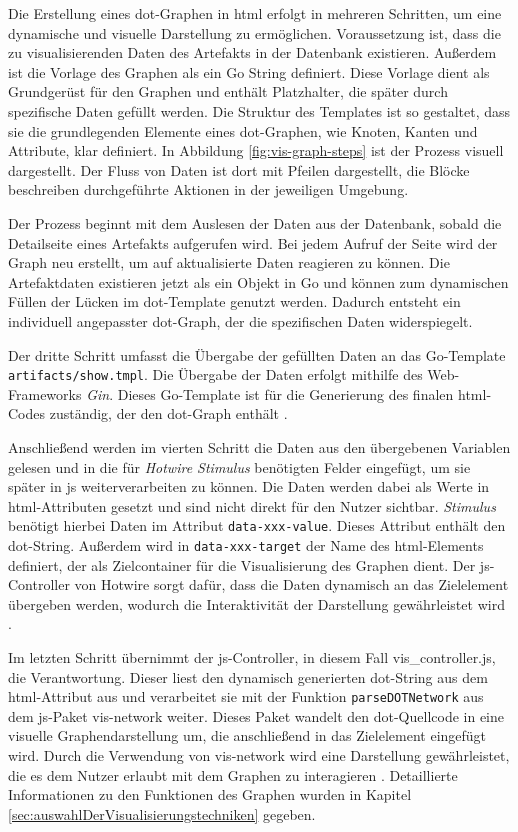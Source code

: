 \par Die Erstellung eines \gls{dot}-Graphen in \gls{html} erfolgt in mehreren Schritten, um eine dynamische und visuelle Darstellung zu ermöglichen. Voraussetzung ist, dass die zu visualisierenden Daten des Artefakts in der Datenbank existieren. Außerdem ist die Vorlage des Graphen als ein Go String definiert. Diese Vorlage dient als Grundgerüst für den Graphen und enthält Platzhalter, die später durch spezifische Daten gefüllt werden. Die Struktur des Templates ist so gestaltet, dass sie die grundlegenden Elemente eines \gls{dot}-Graphen, wie Knoten, Kanten und Attribute, klar definiert. In Abbildung \ref{fig:vis-graph-steps} ist der Prozess visuell dargestellt. Der Fluss von Daten ist dort mit Pfeilen dargestellt, die Blöcke beschreiben durchgeführte Aktionen in der jeweiligen Umgebung.
\par Der Prozess beginnt mit dem Auslesen der Daten aus der Datenbank, sobald die Detailseite eines Artefakts aufgerufen wird. Bei jedem Aufruf der Seite wird der Graph neu erstellt, um auf aktualisierte Daten reagieren zu können. Die Artefaktdaten existieren jetzt als ein Objekt in Go und können zum dynamischen Füllen der Lücken im \gls{dot}-Template genutzt werden. Dadurch entsteht ein individuell angepasster \gls{dot}-Graph, der die spezifischen Daten widerspiegelt.
\par Der dritte Schritt umfasst die Übergabe der gefüllten Daten an das Go-Template \verb|artifacts/show.tmpl|. Die Übergabe der Daten erfolgt mithilfe des Web-Frameworks \textit{Gin}. Dieses Go-Template ist für die Generierung des finalen \gls{html}-Codes zuständig, der den \gls{dot}-Graph enthält \autocite{GingonicGinGin}.
\par Anschließend werden im vierten Schritt die Daten aus den übergebenen Variablen gelesen und in die für \textit{Hotwire Stimulus} benötigten Felder eingefügt, um sie später in \gls{js} weiterverarbeiten zu können. Die Daten werden dabei als Werte in \gls{html}-Attributen gesetzt und sind nicht direkt für den Nutzer sichtbar. \textit{Stimulus} benötigt hierbei Daten im Attribut \verb|data-xxx-value|. Dieses Attribut enthält den \gls{dot}-String. Außerdem wird in \verb|data-xxx-target| der Name des \gls{html}-Elements definiert, der als Zielcontainer für die Visualisierung des Graphen dient. Der \gls{js}-Controller von Hotwire sorgt dafür, dass die Daten dynamisch an das Zielelement übergeben werden, wodurch die Interaktivität der Darstellung gewährleistet wird \autocite{StimulusReference}.
\par Im letzten Schritt übernimmt der \gls{js}-Controller, in diesem Fall vis\_controller.js, die Verantwortung. Dieser liest den dynamisch generierten \gls{dot}-String aus dem \gls{html}-Attribut aus und verarbeitet sie mit der Funktion \verb|parseDOTNetwork| aus dem \gls{js}-Paket vis-network weiter. Dieses Paket wandelt den \gls{dot}-Quellcode in eine visuelle Graphendarstellung um, die anschließend in das Zielelement eingefügt wird. Durch die Verwendung von vis-network wird eine Darstellung gewährleistet, die es dem Nutzer erlaubt mit dem Graphen zu interagieren \autocite{VisjsVisnetwork2024}. Detaillierte Informationen zu den Funktionen des Graphen wurden in Kapitel \ref{sec:auswahlDerVisualisierungstechniken} gegeben.
